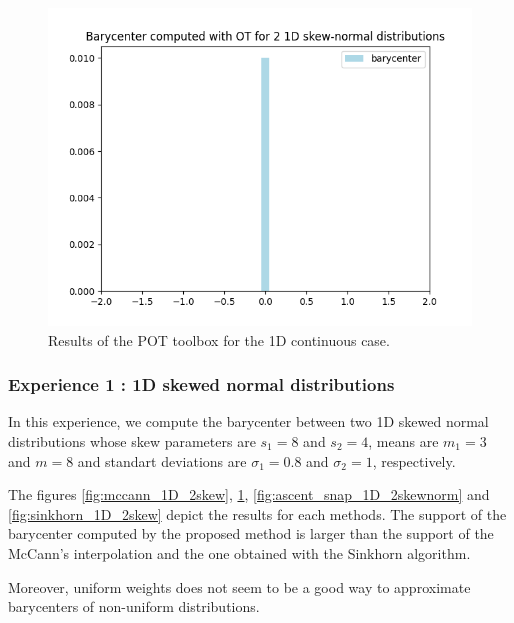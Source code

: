 \begin{figure}
    \centering
    \includegraphics[scale=.4]{figures/ot_barycenter_1D_2skewnorm.png}
    \caption{Results of the POT toolbox for the 1D continuous case. }
    \label{fig:pot_1D_2skewnorm}
\end{figure}

\subsubsection{Experience 1 : 1D skewed normal distributions}

In this experience, we compute the barycenter between two 1D skewed normal distributions whose skew parameters are $s_1=8$ and $s_2=4$, means are $m_1=3$ and $m=8$ and standart deviations are $\sigma_1=0.8$ and $\sigma_2=1$, respectively.  

The figures \ref{fig:mccann_1D_2skew}, \ref{fig:pot_1D_2skewnorm}, \ref{fig:ascent_snap_1D_2skewnorm} and \ref{fig:sinkhorn_1D_2skew} depict the results for each methods. The support of the barycenter computed by the proposed method is larger than the support of the McCann's interpolation and the one obtained with the Sinkhorn algorithm. 

Moreover, uniform weights does not seem to be a good way to approximate barycenters of non-uniform distributions.

